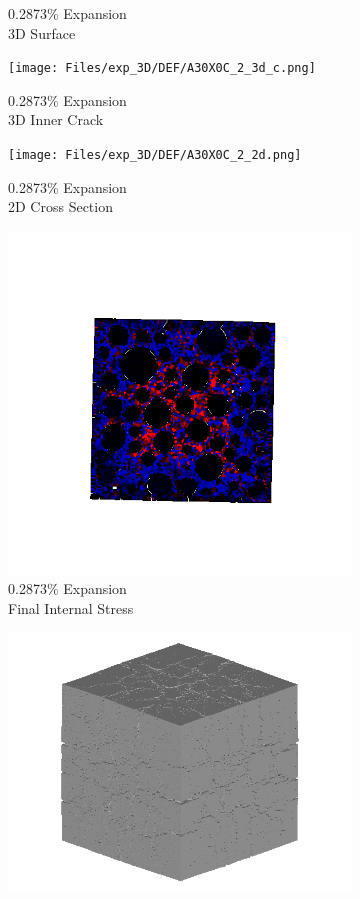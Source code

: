 \begin{figure}[ht!]
\begin{subfigure}{.25\textwidth}
      \caption{0.2873\% Expansion\\3D Surface}
    \end{subfigure}%
    \begin{subfigure}{.25\textwidth}
      \centering
      \texttt{[image: Files/exp\_3D/DEF/A30X0C\_2\_3d\_c.png]}
      \caption{0.2873\% Expansion\\3D Inner Crack}
    \end{subfigure}%
    \begin{subfigure}{.25\textwidth}
      \centering
      \texttt{[image: Files/exp\_3D/DEF/A30X0C\_2\_2d.png]}
      \caption{0.2873\% Expansion\\2D Cross Section}
    \end{subfigure}%
    \begin{subfigure}{.25\textwidth}
      \centering
      \includegraphics[width=.8\linewidth]{Files/exp_3D/DEF/A30X0C_2_stress.png}
      \caption{0.2873\% Expansion\\Final Internal Stress}
    \end{subfigure}
    \begin{subfigure}{.25\textwidth}
      \centering
      \includegraphics[width=.8\linewidth]{Files/exp_3D/DEF/A30X0C_3_3d.png}

\end{subfigure}
\end{figure}
